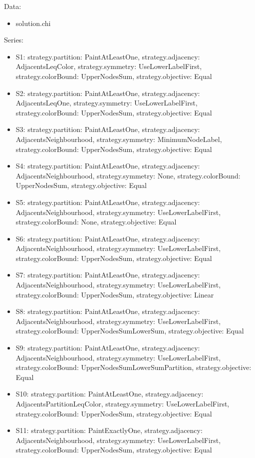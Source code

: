 \documentclass[landscape, 12pt]{report}
\begin{document}
Data:
\begin{itemize}
\item solution.chi
\end{itemize}
Series:
\begin{itemize}
\item S1: strategy.partition: PaintAtLeastOne, strategy.adjacency: AdjacentsLeqColor, strategy.symmetry: UseLowerLabelFirst, strategy.colorBound: UpperNodesSum, strategy.objective: Equal
\item S2: strategy.partition: PaintAtLeastOne, strategy.adjacency: AdjacentsLeqOne, strategy.symmetry: UseLowerLabelFirst, strategy.colorBound: UpperNodesSum, strategy.objective: Equal
\item S3: strategy.partition: PaintAtLeastOne, strategy.adjacency: AdjacentsNeighbourhood, strategy.symmetry: MinimumNodeLabel, strategy.colorBound: UpperNodesSum, strategy.objective: Equal
\item S4: strategy.partition: PaintAtLeastOne, strategy.adjacency: AdjacentsNeighbourhood, strategy.symmetry: None, strategy.colorBound: UpperNodesSum, strategy.objective: Equal
\item S5: strategy.partition: PaintAtLeastOne, strategy.adjacency: AdjacentsNeighbourhood, strategy.symmetry: UseLowerLabelFirst, strategy.colorBound: None, strategy.objective: Equal
\item S6: strategy.partition: PaintAtLeastOne, strategy.adjacency: AdjacentsNeighbourhood, strategy.symmetry: UseLowerLabelFirst, strategy.colorBound: UpperNodesSum, strategy.objective: Equal
\item S7: strategy.partition: PaintAtLeastOne, strategy.adjacency: AdjacentsNeighbourhood, strategy.symmetry: UseLowerLabelFirst, strategy.colorBound: UpperNodesSum, strategy.objective: Linear
\item S8: strategy.partition: PaintAtLeastOne, strategy.adjacency: AdjacentsNeighbourhood, strategy.symmetry: UseLowerLabelFirst, strategy.colorBound: UpperNodesSumLowerSum, strategy.objective: Equal
\item S9: strategy.partition: PaintAtLeastOne, strategy.adjacency: AdjacentsNeighbourhood, strategy.symmetry: UseLowerLabelFirst, strategy.colorBound: UpperNodesSumLowerSumPartition, strategy.objective: Equal
\item S10: strategy.partition: PaintAtLeastOne, strategy.adjacency: AdjacentsPartitionLeqColor, strategy.symmetry: UseLowerLabelFirst, strategy.colorBound: UpperNodesSum, strategy.objective: Equal
\item S11: strategy.partition: PaintExactlyOne, strategy.adjacency: AdjacentsNeighbourhood, strategy.symmetry: UseLowerLabelFirst, strategy.colorBound: UpperNodesSum, strategy.objective: Equal
\end{itemize}
\end{document}
